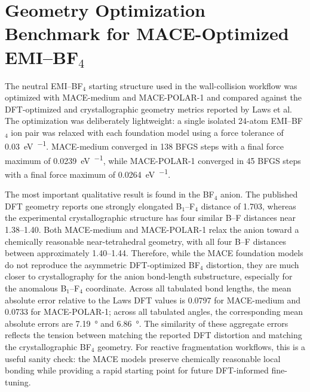 \documentclass[11pt]{article}
\begin{document}
\section*{Geometry Optimization Benchmark for MACE-Optimized EMI--BF$_4$}

The neutral EMI--BF$_4$ starting structure used in the wall-collision workflow
was optimized with MACE-medium and MACE-POLAR-1 and compared against the
DFT-optimized and crystallographic geometry metrics reported by Laws et al.
The optimization was deliberately lightweight: a single isolated 24-atom
EMI--BF$_4$ ion pair was relaxed with each foundation model using a force
tolerance of \SI{0.03}{eV\per\text{\AA}}. MACE-medium converged in 138 BFGS
steps with a final force maximum of \SI{0.0239}{eV\per\text{\AA}}, while
MACE-POLAR-1 converged in 45 BFGS steps with a final force maximum of
\SI{0.0264}{eV\per\text{\AA}}.

The most important qualitative result is found in the BF$_4$ anion. The
published DFT geometry reports one strongly elongated B$_1$--F$_4$ distance of
\SI{1.703}{\text{\AA}}, whereas the experimental crystallographic structure has
four similar B--F distances near \SIrange{1.38}{1.40}{\text{\AA}}. Both
MACE-medium and MACE-POLAR-1 relax the anion toward a chemically reasonable
near-tetrahedral geometry, with all four B--F distances between approximately
\SIrange{1.40}{1.44}{\text{\AA}}. Therefore, while the MACE foundation models
do not reproduce the asymmetric DFT-optimized BF$_4$ distortion, they are much
closer to crystallography for the anion bond-length substructure, especially
for the anomalous B$_1$--F$_4$ coordinate. Across all tabulated bond lengths,
the mean absolute error relative to the Laws DFT values is
\SI{0.0797}{\text{\AA}} for MACE-medium and \SI{0.0733}{\text{\AA}} for
MACE-POLAR-1; across all tabulated angles, the corresponding mean absolute
errors are \SI{7.19}{\degree} and \SI{6.86}{\degree}. The similarity of these
aggregate errors reflects the tension between matching the reported DFT
distortion and matching the crystallographic BF$_4$ geometry. For reactive
fragmentation workflows, this is a useful sanity check: the MACE models
preserve chemically reasonable local bonding while providing a rapid starting
point for future DFT-informed fine-tuning.
\end{document}
